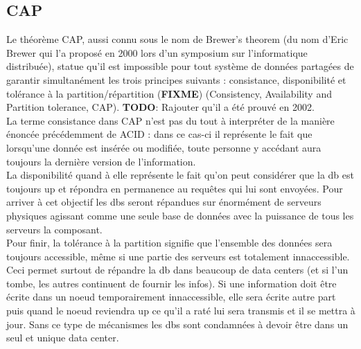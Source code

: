 \documentclass[11pt]{article}
\begin{document}
\subsection{CAP}
Le théorème CAP, aussi connu sous le nom de Brewer's theorem (du nom d'Eric Brewer qui l'a proposé en 2000 lors d'un symposium sur l'informatique distribuée), statue qu'il est impossible pour tout système de données partagées de garantir simultanément les trois principes suivants : consistance, disponibilité et tolérance à la partition/répartition (\colorbox{BrickRed}{\textbf{FIXME}}) (Consistency, Availability and Partition tolerance, CAP). \colorbox{BrickRed}{\textbf{TODO}: Rajouter qu'il a été prouvé en 2002.} \\
La terme consistance dans CAP n'est pas du tout à interpréter de la manière énoncée précédemment de ACID : dans ce cas-ci il représente le fait que lorsqu'une donnée est insérée ou modifiée, toute personne y accédant aura toujours la dernière version de l'information. \\
La disponibilité quand à elle représente le fait qu'on peut considérer que la db est toujours up et répondra en permanence au requêtes qui lui sont envoyées. Pour arriver à cet objectif les dbs seront répandues sur énormément de serveurs physiques agissant comme une seule base de données avec la puissance de tous les serveurs la composant. \\
Pour finir, la tolérance à la partition signifie que l'ensemble des données sera toujours accessible, même si une partie des serveurs est totalement innaccessible. Ceci permet surtout de répandre la db dans beaucoup de data centers (et si l'un tombe, les autres continuent de fournir les infos). Si une information doit être écrite dans un noeud temporairement innaccessible, elle sera écrite autre part puis quand le noeud reviendra up ce qu'il a raté lui sera transmis et il se mettra à jour. Sans ce type de mécanismes les dbs sont condamnées à devoir être dans un seul et unique data center. 
\end{document}
